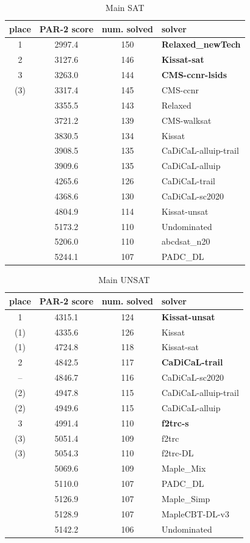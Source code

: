 \documentclass{elsarticle}
\begin{document}
\begin{table}
\caption{Main SAT}
\label{tab:mainSAT}
\begin{tabular}{cccl}
place & PAR-2 score & num. solved & solver \\
\hline
 1    & 2997.4 & 150 & {\bf Relaxed\_newTech} \\
 2    & 3127.6 & 146 & {\bf Kissat-sat} \\
 3    & 3263.0 & 144 & {\bf CMS-ccnr-lsids} \\
(3)   & 3317.4 & 145 & CMS-ccnr \\
      & 3355.5 & 143 & Relaxed \\
      & 3721.2 & 139 & CMS-walksat \\
      & 3830.5 & 134 & Kissat \\
      & 3908.5 & 135 & CaDiCaL-alluip-trail \\
      & 3909.6 & 135 & CaDiCaL-alluip \\
      & 4265.6 & 126 & CaDiCaL-trail \\
      & 4368.6 & 130 & CaDiCaL-sc2020 \\
      & 4804.9 & 114 & Kissat-unsat \\
      & 5173.2 & 110 & Undominated \\
      & 5206.0 & 110 & abcdsat\_n20 \\
      & 5244.1 & 107 & PADC\_DL \\   
\end{tabular}
\end{table}


\begin{table}
\caption{Main UNSAT}
\label{tab:mainUNSAT}
\begin{tabular}{cccl}
place & PAR-2 score & num. solved & solver \\
\hline   
1     & 4315.1 & 124 & {\bf Kissat-unsat} \\
(1)   & 4335.6 & 126 & Kissat \\
(1)   & 4724.8 & 118 & Kissat-sat \\
 2    & 4842.5 & 117 & {\bf CaDiCaL-trail} \\
--    & 4846.7 & 116 & CaDiCaL-sc2020 \\
(2)   & 4947.8 & 115 & CaDiCaL-alluip-trail \\
(2)   & 4949.6 & 115 & CaDiCaL-alluip \\
 3    & 4991.4 & 110 & {\bf f2trc-s} \\
(3)   & 5051.4 & 109 & f2trc \\
(3)   & 5054.3 & 110 & f2trc-DL \\
      & 5069.6 & 109 & Maple\_Mix \\
      & 5110.0 & 107 & PADC\_DL \\
      & 5126.9 & 107 & Maple\_Simp \\
      & 5128.9 & 107 & MapleCBT-DL-v3 \\
      & 5142.2 & 106 & Undominated \\
\end{tabular}
\end{table}
\end{document}
